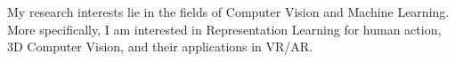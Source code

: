 


\begin{cventries}

\cvtext
{ %
\begin{cvitems}
    My research interests lie in the fields of Computer Vision and Machine Learning. More specifically, I am interested in Representation Learning for human action, 3D Computer Vision, and their applications in VR/AR.
\end{cvitems}
}


\end{cventries}
